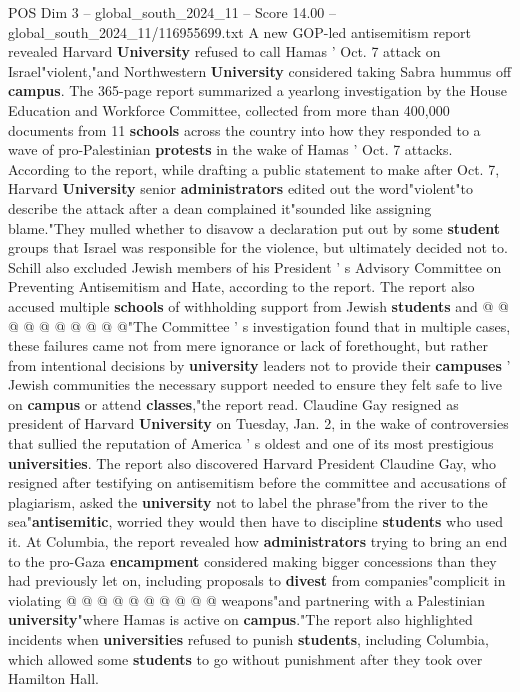 \begin{textsample}{POS Dim 3 – global\_south\_2024\_11 – Score 14.00 – global\_south\_2024\_11/116955699.txt}  \label{ex:f3_pos_299}
A new GOP-led antisemitism report revealed Harvard \textbf{University} refused to call Hamas ' Oct. 7 attack on Israel"violent,"and Northwestern \textbf{University} considered taking Sabra hummus off \textbf{campus}.
The 365-page report summarized a yearlong investigation by the House Education and Workforce Committee, collected from more than 400,000 documents from 11 \textbf{schools} across the country into how they responded to a wave of pro-Palestinian \textbf{protests} in the wake of Hamas ' Oct. 7 attacks.
According to the report, while drafting a public statement to make after Oct. 7, Harvard \textbf{University} senior \textbf{administrators} edited out the word"violent"to describe the attack after a dean complained it"sounded like assigning blame."They mulled whether to disavow a declaration put out by some \textbf{student} groups that Israel was responsible for the violence, but ultimately decided not to.
Schill also excluded Jewish members of his President ' s Advisory Committee on Preventing Antisemitism and Hate, according to the report.
The report also accused multiple \textbf{schools} of withholding support from Jewish \textbf{students} and @ @ @ @ @ @ @ @ @ @"The Committee ' s investigation found that in multiple cases, these failures came not from mere ignorance or lack of forethought, but rather from intentional decisions by \textbf{university} leaders not to provide their \textbf{campuses} ' Jewish communities the necessary support needed to ensure they felt safe to live on \textbf{campus} or attend \textbf{classes},"the report read.
Claudine Gay resigned as president of Harvard \textbf{University} on Tuesday, Jan. 2, in the wake of controversies that sullied the reputation of America ' s oldest and one of its most prestigious \textbf{universities}.
The report also discovered Harvard President Claudine Gay, who resigned after testifying on antisemitism before the committee and accusations of plagiarism, asked the \textbf{university} not to label the phrase"from the river to the sea"\textbf{antisemitic}, worried they would then have to discipline \textbf{students} who used it.
At Columbia, the report revealed how \textbf{administrators} trying to bring an end to the pro-Gaza \textbf{encampment} considered making bigger concessions than they had previously let on, including proposals to \textbf{divest} from companies"complicit in violating @ @ @ @ @ @ @ @ @ @ weapons"and partnering with a Palestinian \textbf{university}"where Hamas is active on \textbf{campus}."The report also highlighted incidents when \textbf{universities} refused to punish \textbf{students}, including Columbia, which allowed some \textbf{students} to go without punishment after they took over Hamilton Hall.

\end{textsample}
